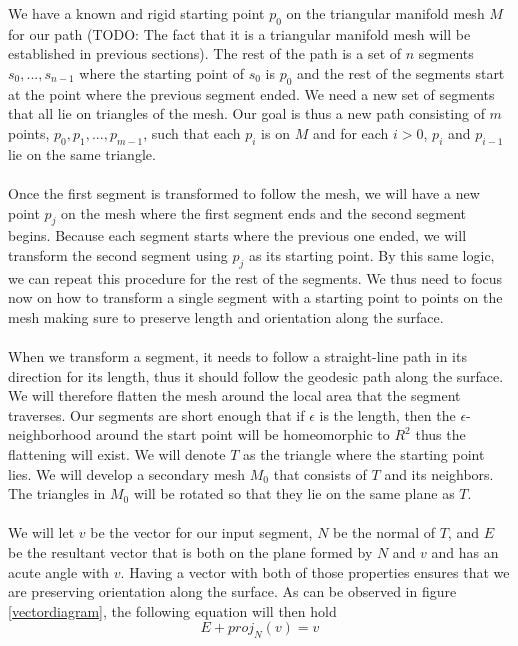 We have a known and rigid starting point $p_0$ on the triangular manifold mesh $M$ for our path (TODO: The fact that it is a triangular manifold mesh will be established in previous sections). The rest of the path is a set of $n$ segments $s_0,...,s_{n-1}$ where the starting point of $s_0$ is $p_0$ and the rest of the segments start at the point where the previous segment ended. We need a new set of segments that all lie on triangles of the mesh. Our goal is thus a new path consisting of $m$ points, $p_0, p_1,...,p_{m-1}$, such that each $p_i$ is on $M$ and for each $i>0$, $p_{i}$ and $p_{i-1}$ lie on the same triangle. \\
\\
Once the first segment is transformed to follow the mesh, we will have a new point $p_j$ on the mesh where the first segment ends and the second segment begins. Because each segment starts where the previous one ended, we will transform the second segment using $p_j$ as its starting point. By this same logic, we can repeat this procedure for the rest of the segments. We thus need to focus now on how to transform a single segment with a starting point to points on the mesh making sure to preserve length and orientation along the surface. \\
\\
When we transform a segment, it needs to follow a straight-line path in its direction for its length, thus it should follow the geodesic path along the surface. We will therefore flatten the mesh around the local area that the segment traverses. Our segments are short enough that if $\epsilon$ is the length, then the $\epsilon$-neighborhood around the start point will be homeomorphic to $R^2$ thus the flattening will exist. We will denote $T$ as the triangle where the starting point lies. We will develop a secondary mesh $M_0$ that consists of $T$ and its neighbors. The triangles in $M_0$ will be rotated so that they lie on the same plane as $T$. \\
\\
We will let $v$ be the vector for our input segment, $N$ be the normal of $T$, and $E$ be the resultant vector that is both on the plane formed by $N$ and $v$ and has an acute angle with $v$. Having a vector with both of those properties ensures that we are preserving orientation along the surface. As can be observed in figure \ref{vectordiagram}, the following equation will then hold
\[
E + proj_N(v) = v
\]

